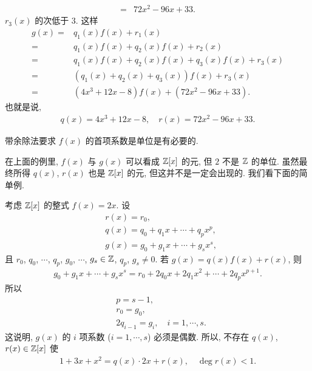 \begin{example}
\begin{align*}
        = {} & 72x^2 - 96x + 33.
    \end{align*}
    $r_3 (x)$ 的次低于 $3$. 这样
    \begin{align*}
        g(x)
        = {} & q_1 (x) f(x) + r_1 (x)                               \\
        = {} & q_1 (x) f(x) + q_2 (x) f(x) + r_2 (x)                \\
        = {} & q_1 (x) f(x) + q_2 (x) f(x) + q_3 (x) f(x) + r_3 (x) \\
        = {} & (q_1 (x) + q_2 (x) + q_3 (x)) f(x) + r_3 (x)         \\
        = {} & (4x^3 + 12x - 8) f(x) + (72x^2 - 96x + 33).
    \end{align*}
    也就是说,
    \begin{align*}
        q(x) = 4x^3 + 12x - 8, \quad r(x) = 72x^2 - 96x + 33.
    \end{align*}
\end{example}

\begin{remark}
    带余除法要求 $f(x)$ 的首项系数是单位是有必要的.

    在上面的例里, $f(x)$ 与 $g(x)$ 可以看成 $\mathbb{Z}[x]$ 的元, 但 $2$ 不是 $\mathbb{Z}$ 的单位. 虽然最终所得 $q(x)$, $r(x)$ 也是 $\mathbb{Z}[x]$ 的元, 但这并不是一定会出现的. 我们看下面的简单例.

    考虑 $\mathbb{Z}[x]$ 的整式 $f(x)=2x$. 设
    \begin{align*}
         & r(x) = r_0,                            \\
         & q(x) = q_0 + q_1 x + \cdots + q_p x^p, \\
         & g(x) = g_0 + g_1 x + \cdots + g_s x^s,
    \end{align*}
    且 $r_0$, $q_0$, $\cdots$, $q_p$, $g_0$, $\cdots$, $g_s \in \mathbb{Z}$, $q_p$, $g_s \neq 0$. 若 $g(x) = q(x)f(x) + r(x)$, 则
    \begin{align*}
        g_0 + g_1 x + \cdots + g_s x^s = r_0 + 2q_0 x + 2q_1 x^2 + \cdots + 2q_p x^{p+1}.
    \end{align*}
    所以
    \begin{align*}
         & p = s - 1,                          \\
         & r_0 = g_0,                          \\
         & 2q_{i-1} = g_i, \quad i=1,\cdots,s.
    \end{align*}
    这说明, $g(x)$ 的 $i$ 项系数 ($i=1,\cdots,s$) 必须是偶数. 所以, 不存在 $q(x)$, $r(x) \in \mathbb{Z}[x]$ 使
    \begin{align*}
        1 + 3x + x^2 = q(x) \cdot 2x + r(x), \quad \deg r(x) < 1.
    \end{align*}
\end{remark}

